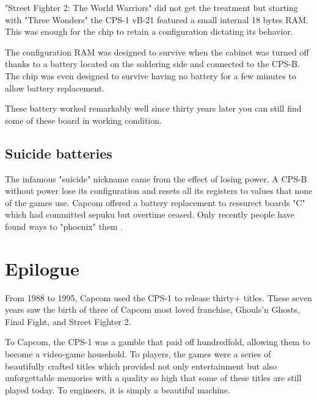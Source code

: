 "Street Fighter 2: The World Warriors" did not get the treatment but starting with "Three Wonders" the CPS-1 vB-21 featured a small internal 18 bytes RAM. This was enough for the chip to retain a configuration dictating its behavior\cite{petitSecurity}.

The configuration RAM was designed to survive when the cabinet was turned off thanks to a battery located  on the soldering side and connected to the CPS-B. The chip was even designed to survive having no battery for a few minutes to allow battery replacement.

\begin{trivia}
These battery worked remarkably well since thirty years later you can still find some of these board in working condition.
\end{trivia}

\subsection{Suicide batteries}
The infamous "suicide" nickname came from the effect of losing power. A CPS-B without power lose its configuration and resets all its registers to values that none of the games use. Capcom offered a battery replacement to ressurect boards "C" which had committed sepuku but overtime ceased. Only recently people have found ways to "phoenix" them .










\section{Epilogue}
From 1988 to 1995, Capcom used the CPS-1 to release thirty+ titles. These seven years saw the birth of three of Capcom most loved franchise, Ghouls’n Ghosts, Final Fight, and Street Fighter 2.

To Capcom, the CPS-1 was a gamble that paid off hundredfold, allowing them to become a video-game household. To players, the games were a series of beautifully crafted titles which provided not only entertainment but also unforgettable memories with a quality so high that some of these titles are still played today. To engineers, it is simply a beautiful machine.

